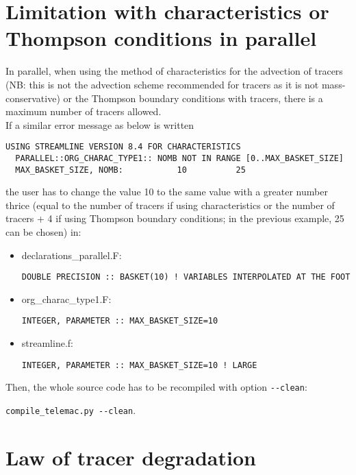 \section{Limitation with characteristics or Thompson conditions in parallel}

In parallel, when using the method of characteristics for the advection of
tracers (NB: this is not the advection scheme recommended for tracers
as it is not mass-conservative)
or the Thompson boundary conditions with tracers, there is a maximum number
of tracers allowed.\\

If a similar error message as below is written

\begin{lstlisting}[language=TelFortran]
 USING STREAMLINE VERSION 8.4 FOR CHARACTERISTICS
  PARALLEL::ORG_CHARAC_TYPE1:: NOMB NOT IN RANGE [0..MAX_BASKET_SIZE]
  MAX_BASKET_SIZE, NOMB:           10          25
\end{lstlisting}

the user has to change the value 10 to the same value with a greater number
thrice (equal to the number of tracers if using characteristics
or the number of tracers + 4 if using Thompson boundary conditions;
in the previous example, 25 can be chosen) in:
\begin{itemize}
\item declarations\_parallel.F:
\begin{lstlisting}[language=TelFortran]
DOUBLE PRECISION :: BASKET(10) ! VARIABLES INTERPOLATED AT THE FOOT
\end{lstlisting}

\item org\_charac\_type1.F:
\begin{lstlisting}[language=TelFortran]
INTEGER, PARAMETER :: MAX_BASKET_SIZE=10
\end{lstlisting}

\item streamline.f:
\begin{lstlisting}[language=TelFortran]
INTEGER, PARAMETER :: MAX_BASKET_SIZE=10 ! LARGE
\end{lstlisting}
\end{itemize}

Then, the whole source code has to be recompiled with option \verb!--clean!:

\verb!compile_telemac.py --clean!.


\section{Law of tracer degradation}

